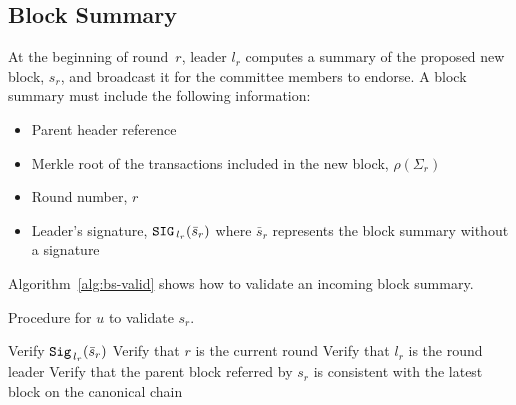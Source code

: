 \documentclass{article}
\begin{document}
\subsection{Block Summary}
At the beginning of round~$r$, leader $l_r$ computes a summary of the proposed new block, $s_r$, and broadcast it for the committee members to endorse. A block summary must include the following information:
\begin{itemize}
    \item Parent header reference
    \item Merkle root of the transactions included in the new block, $\rho(\Sigma_r)$
    \item Round number, $r$
    \item Leader's signature, ${\tt SIG}_{\,l_r}(\bar{s}_r)$ where $\bar{s}_r$ represents the block summary without a signature
\end{itemize}



Algorithm~\ref{alg:bs-valid} shows how to validate an incoming block summary.

\begin{algorithm}[H]
\caption{Procedure for $u$ to validate $s_r$.}
\label{alg:bs-valid}
\begin{spacing}{1.2}
\begin{algorithmic}[1]
    \vspace{1ex}
    \State Verify ${\tt Sig}_{\,l_r}(\bar{s}_r)$
    \State Verify that $r$ is the current round
    \State Verify that $l_r$ is the round leader
    \State Verify that the parent block referred by $s_r$ is consistent with the latest block on the canonical chain
\end{algorithmic}
\end{spacing}
\end{algorithm}
\end{document}
